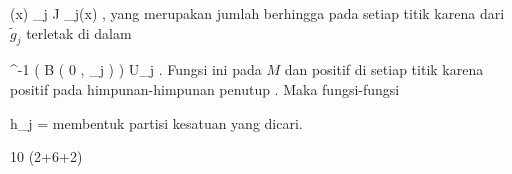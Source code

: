 {\mavergleichskettedisp
{\vergleichskette
{ (x)
}
{ } { \sum_{j \in J} _j(x)
}
{ } {
}
{ } {
}
{ } {
}
}
{}{}{,}
yang merupakan jumlah berhingga pada setiap titik karena
dari $\tilde{g}_j$ terletak di dalam

\mavergleichskettedisp
{\vergleichskette
{ \alpha^{-1} \left(  B  \left(  0 , \delta_j  \right)  \right)
}
{ \subset} { U_j
}
{ } {
}
{ } {
}
{ } {
}
}
{}{}{}
. Fungsi ini
pada $M$ dan positif di setiap titik karena
 positif pada himpunan-himpunan penutup
. Maka fungsi-fungsi

\mavergleichskettedisp
{\vergleichskette
{ h_j
}
{ =} { {  }
}
{ } {
}
{ } {
}
{ } {
}
}
{}{}{}
membentuk partisi kesatuan yang dicari.

 }



{10 (2+6+2)}


